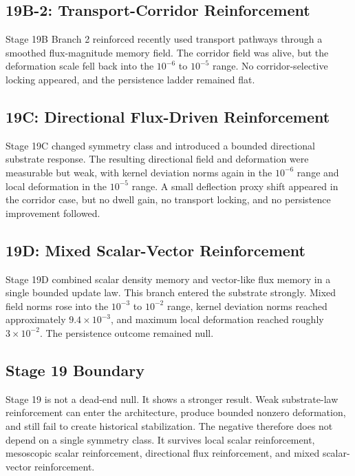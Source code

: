 \documentclass[11pt]{article}
\begin{document}
\subsection{19B-2: Transport-Corridor Reinforcement}

Stage 19B Branch 2 reinforced recently used transport pathways through a smoothed flux-magnitude memory field. The corridor field was alive, but the deformation scale fell back into the $10^{-6}$ to $10^{-5}$ range. No corridor-selective locking appeared, and the persistence ladder remained flat.

\subsection{19C: Directional Flux-Driven Reinforcement}

Stage 19C changed symmetry class and introduced a bounded directional substrate response. The resulting directional field and deformation were measurable but weak, with kernel deviation norms again in the $10^{-6}$ range and local deformation in the $10^{-5}$ range. A small deflection proxy shift appeared in the corridor case, but no dwell gain, no transport locking, and no persistence improvement followed.

\subsection{19D: Mixed Scalar-Vector Reinforcement}

Stage 19D combined scalar density memory and vector-like flux memory in a single bounded update law. This branch entered the substrate strongly. Mixed field norms rose into the $10^{-3}$ to $10^{-2}$ range, kernel deviation norms reached approximately $9.4\times10^{-3}$, and maximum local deformation reached roughly $3\times10^{-2}$. The persistence outcome remained null.

\subsection{Stage 19 Boundary}

Stage 19 is not a dead-end null. It shows a stronger result. Weak substrate-law reinforcement can enter the architecture, produce bounded nonzero deformation, and still fail to create historical stabilization. The negative therefore does not depend on a single symmetry class. It survives local scalar reinforcement, mesoscopic scalar reinforcement, directional flux reinforcement, and mixed scalar-vector reinforcement.
\end{document}
